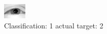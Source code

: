 \begin{figure}[h!]
\begin{center}
\includegraphics[width=0.60\columnwidth]{figures/ID2325_class_1_target_2.png}
\end{center}
\caption{ Classification: 1 actual target: 2}
\label{fig:ID2325_class_1_target_2}
\end{figure}
